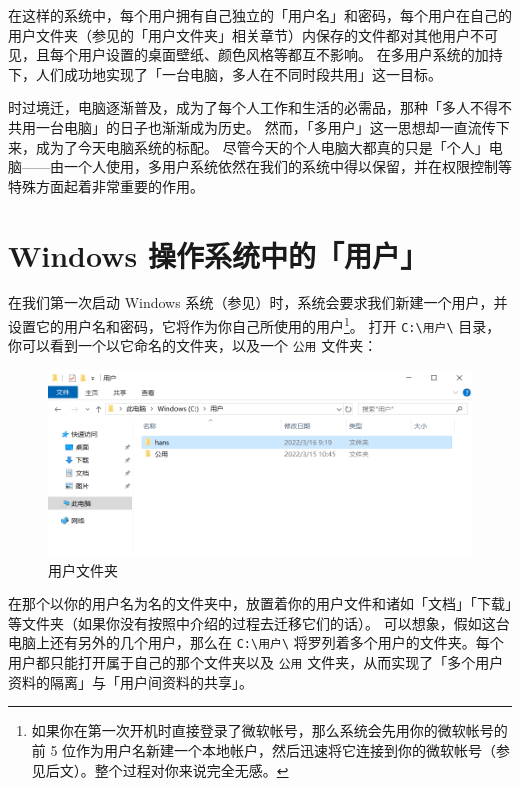 在这样的系统中，每个用户拥有自己独立的「用户名」和密码，每个用户在自己的用户文件夹（参见的「用户文件夹」相关章节）内保存的文件都对其他用户不可见，且每个用户设置的桌面壁纸、颜色风格等都互不影响。
在多用户系统的加持下，人们成功地实现了「一台电脑，多人在不同时段共用」这一目标。

时过境迁，电脑逐渐普及，成为了每个人工作和生活的必需品，那种「多人不得不共用一台电脑」的日子也渐渐成为历史。
然而，「多用户」这一思想却一直流传下来，成为了今天电脑系统的标配。
尽管今天的个人电脑大都真的只是「个人」电脑——由一个人使用，多用户系统依然在我们的系统中得以保留，并在权限控制等特殊方面起着非常重要的作用。

\section{Windows 操作系统中的「用户」}

在我们第一次启动 Windows 系统（参见）时，系统会要求我们新建一个用户，并设置它的用户名和密码，它将作为你自己所使用的用户\footnote{如果你在第一次开机时直接登录了微软帐号，那么系统会先用你的微软帐号的前 5 位作为用户名新建一个本地帐户，然后迅速将它连接到你的微软帐号（参见后文）。整个过程对你来说完全无感。}。
打开 \verb|C:\用户\| 目录，你可以看到一个以它命名的文件夹，以及一个 \verb|公用| 文件夹：

\begin{figure}[htb!]
  \centering
  \includegraphics[width=12cm]{assets/User_Folder.png}
  \caption{用户文件夹}
  \label{user-folder}
\end{figure}

在那个以你的用户名为名的文件夹中，放置着你的用户文件和诸如「文档」「下载」等文件夹（如果你没有按照中介绍的过程去迁移它们的话）。
可以想象，假如这台电脑上还有另外的几个用户，那么在 \verb|C:\用户\| 将罗列着多个用户的文件夹。每个用户都只能打开属于自己的那个文件夹以及 \verb|公用| 文件夹，从而实现了「多个用户资料的隔离」与「用户间资料的共享」。

